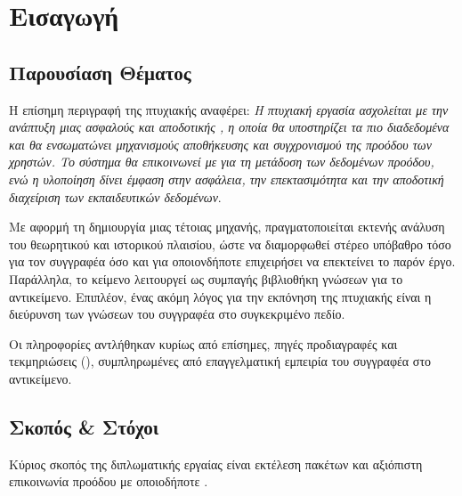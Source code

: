 \chapter{Εισαγωγή}\label{ch:intro}

\section{Παρουσίαση Θέματος}
Η επίσημη περιγραφή της πτυχιακής αναφέρει: {\itshape Η πτυχιακή εργασία ασχολείται με την ανάπτυξη μιας ασφαλούς και αποδοτικής ,
η οποία θα υποστηρίζει τα πιο διαδεδομένα  και θα ενσωματώνει μηχανισμούς αποθήκευσης και συγχρονισμού της προόδου των χρηστών.
Το σύστημα θα επικοινωνεί με  για τη μετάδοση των δεδομένων προόδου, ενώ η υλοποίηση δίνει έμφαση στην ασφάλεια,
την επεκτασιμότητα και την αποδοτική διαχείριση των εκπαιδευτικών δεδομένων}. 

Με αφορμή τη δημιουργία μιας τέτοιας μηχανής, πραγματοποιείται εκτενής ανάλυση του θεωρητικού και ιστορικού πλαισίου, ώστε να διαμορφωθεί στέρεο υπόβαθρο τόσο 
για τον συγγραφέα όσο και για οποιονδήποτε επιχειρήσει να επεκτείνει το παρόν έργο. Παράλληλα, το κείμενο λειτουργεί ως συμπαγής βιβλιοθήκη γνώσεων για το αντικείμενο.
Επιπλέον, ένας ακόμη λόγος για την εκπόνηση της πτυχιακής είναι η διεύρυνση των γνώσεων του συγγραφέα στο συγκεκριμένο πεδίο.

Οι πληροφορίες αντλήθηκαν κυρίως από επίσημες, πηγές προδιαγραφές και τεκμηριώσεις (), συμπληρωμένες από επαγγελματική εμπειρία του συγγραφέα στο αντικείμενο.

\section{Σκοπός \& Στόχοι}
Κύριος σκοπός της διπλωματικής εργαίας είναι εκτέλεση  πακέτων και αξιόπιστη επικοινωνία προόδου με οποιοδήποτε .

